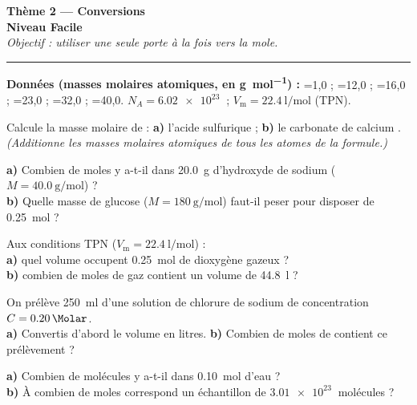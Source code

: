 \documentclass[11pt,a4paper]{article}
\newcommand{\gmol}{\si{\gram\per\mole}}
\newcommand{\Vm}{V_{\mathrm m}}
\begin{document}
\begin{center}
{\LARGE\bfseries\color{primarydark}Thème 2 — Conversions}\\[1pt]
{\large\color{excol}\textbf{Niveau Facile}}\\[2pt]
{\itshape Objectif : utiliser \emph{une seule} porte à la fois vers la mole.}\\
{\color{primary}\rule{0.6\linewidth}{1pt}}
\end{center}

\textbf{Données (masses molaires atomiques, en \gmol) :}
=1,0 ; =12,0 ; =16,0 ; =23,0 ; =32,0 ; =40,0.\quad
$N_A=\SI{6,02e23}{}$ ; \; $\Vm=\SI{22,4}{\litre\per\mole}$ (TPN).

\begin{exo}
Calcule la masse molaire de :\quad
\textbf{a)} l'acide sulfurique  ;\quad
\textbf{b)} le carbonate de calcium .\\
\emph{(Additionne les masses molaires atomiques de tous les atomes de la formule.)}
\end{exo}

\begin{exo}
\textbf{a)} Combien de moles y a-t-il dans \SI{20,0}{\gram} d'hydroxyde de sodium 
($M=\SI{40,0}{\gram\per\mole}$) ?\\
\textbf{b)} Quelle masse de glucose  ($M=\SI{180}{\gram\per\mole}$) faut-il peser pour
disposer de \SI{0,25}{\mole} ?
\end{exo}

\begin{exo}
Aux conditions TPN ($\Vm=\SI{22,4}{\litre\per\mole}$) :\\
\textbf{a)} quel volume occupent \SI{0,25}{\mole} de dioxygène gazeux ?\\
\textbf{b)} combien de moles de gaz contient un volume de \SI{44,8}{\litre} ?
\end{exo}

\begin{exo}
On prélève \SI{250}{\milli\litre} d'une solution de chlorure de sodium de concentration
$C=\SI{0,20}{\Molar}$.\\
\textbf{a)} Convertis d'abord le volume en litres.\quad
\textbf{b)} Combien de moles de  contient ce prélèvement ?
\end{exo}

\begin{exo}
\textbf{a)} Combien de molécules y a-t-il dans \SI{0,10}{\mole} d'eau ?\\
\textbf{b)} À combien de moles correspond un échantillon de $\SI{3,01e23}{}$ molécules ?
\end{exo}
\end{document}
